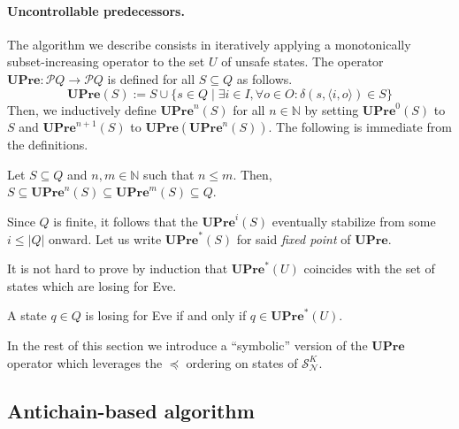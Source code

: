 \documentclass[runningheads,a4paper,draft]{llncs}
\newcommand{\pow}{\mathcal{P}}
\newcommand{\upre}{\mathbf{UPre}}
\newcommand{\eve}{Eve\xspace}
\newcommand{\calN}{\mathcal{N}}
\newcommand{\calS}{\mathcal{S}}
\begin{document}
\paragraph{Uncontrollable predecessors.} The algorithm we describe
consists in iteratively applying a monotonically subset-increasing operator to
the set $U$ of unsafe states. The operator $\upre : \pow{Q} \to \pow{Q}$ is
defined for all $S \subseteq Q$ as follows.
\[
  \upre(S) := S \cup \{s \in Q \mid \exists i \in I, \forall o \in O :
  \delta(s,\langle i, o \rangle) \in S\}
\]
Then, we inductively define $\upre^n(S)$ for all $n \in \mathbb{N}$ by setting
$\upre^0(S)$ to $S$ and $\upre^{n+1}(S)$ to $\upre(\upre^{n}(S))$.
The following is immediate from the definitions.
\begin{lemma}
  Let $S \subseteq Q$ and $n,m \in \mathbb{N}$ such that $n \leq m$. Then,
  $S \subseteq \upre^n(S) \subseteq \upre^m(S) \subseteq Q$.
\end{lemma}
Since $Q$ is finite, it follows that the $\upre^i(S)$ eventually stabilize
from some $i \leq |Q|$ onward.  Let us write $\upre^*(S)$ for said \emph{fixed point}
of $\upre$.

It is not hard to prove by induction that $\upre^*(U)$ coincides with the set
of states which are losing for \eve.
\begin{proposition}
  A state $q \in Q$ is losing for \eve if and only if $q \in \upre^*(U)$.
\end{proposition}

In the rest of this section we introduce a ``symbolic'' version of the $\upre$
operator which leverages the $\preceq$ ordering on states of $\calS^K_\calN$.

\subsection{Antichain-based algorithm}



{ }
\end{document}
